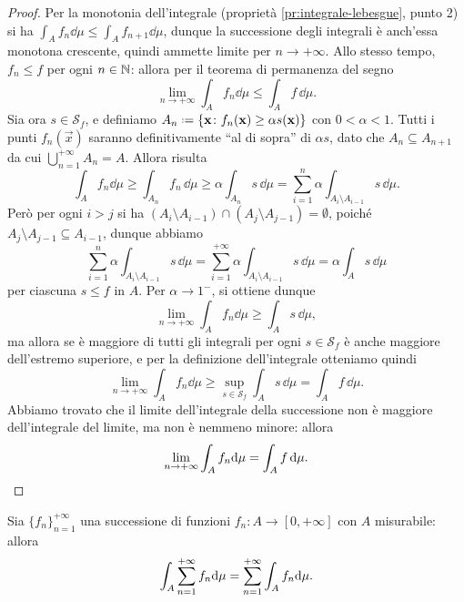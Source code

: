 \begin{proof}
	Per la monotonia dell'integrale (proprietà \ref{pr:integrale-lebesgue}, punto 2) si ha $\int_Af_n\dd\mu\leq\int_Af_{n+1}\dd\mu$, dunque la successione degli integrali è anch'essa monotona crescente, quindi ammette limite per $n\to+\infty$.
	Allo stesso tempo, $f_n\leq f$ per ogni $n\in\mathbb{N}$: allora per il teorema di permanenza del segno
	\begin{equation*}
		\lim_{n\to+\infty}\int_Af_n\dd\mu\leq\int_Af\,\dd\mu.
	\end{equation*}
	Sia ora $s\in\mathcal S_f$, e definiamo $A_n\defeq\{\vec x\colon f_n(\vec x)\geq \alpha s(\vec x)\}$ con $0<\alpha<1$.
	Tutti i punti $f_n(\vec x)$ saranno definitivamente ``al di sopra'' di $\alpha s$, dato che $A_n\subseteq A_{n+1}$ da cui $\bigcup_{n=1}^{+\infty}A_n=A$.
	Allora risulta
	\begin{equation}
		\int_Af_n\dd\mu\geq\int_{A_n}f_n\,\dd\mu\geq\alpha\int_{A_n}s\,\dd\mu=\sum_{i=1}^n\alpha\int_{A_i\setminus A_{i-1}}s\,\dd\mu.	
	\end{equation}
	Però per ogni $i>j$ si ha $(A_i\setminus A_{i-1})\cap(A_j\setminus A_{j-1})=\emptyset$, poich\'e $A_j\setminus A_{j-1}\subseteq A_{i-1}$, dunque abbiamo
	\begin{equation}
		\sum_{i=1}^n\alpha\int_{A_i\setminus A_{i-1}}s\,\dd\mu=\sum_{i=1}^{+\infty}\alpha\int_{A_i\setminus A_{i-1}}s\,\dd\mu=\alpha\int_As\,\dd\mu
	\end{equation}
	per ciascuna $s\leq f$ in $A$.
	Per $\alpha\to 1^-$, si ottiene dunque
	\begin{equation}
		\lim_{n\to+\infty}\int_Af_n\dd\mu\geq\int_As\,\dd\mu,
	\end{equation}
	ma allora se è maggiore di tutti gli integrali per ogni $s\in\mathcal S_f$ è anche maggiore dell'estremo superiore, e per la definizione dell'integrale otteniamo quindi
	\begin{equation}
		\lim_{n\to+\infty}\int_Af_n\dd\mu\geq\sup_{s\in\mathcal S_f}\int_As\,\dd\mu=\int_Af\,\dd\mu.
	\end{equation}
	Abbiamo trovato che il limite dell'integrale della successione non è maggiore dell'integrale del limite, ma non è nemmeno minore: allora
	\begin{equation}
		\lim_{n\to+\infty}\int_Af_n\textup{d}\mu=\int_Af\,\textup{d}\mu.\qedhere
	\end{equation}
\end{proof}
\begin{corollario} \label{cor:serie-integrali}
	Sia $\{f_n\}_{n=1}^{+\infty}$ una successione di funzioni $f_n\colon A\to[0,+\infty]$ con $A$ misurabile: allora
	\begin{equation}
		\int_A\sum_{{n}=1}^{+\infty}f_n\textup{d}\mu=\sum_{{n}=1}^{+\infty}\int_Af_n\textup{d}\mu.
		\label{eq:serie-integrali}
	\end{equation}
\end{corollario}
